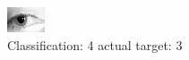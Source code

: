 \begin{figure}[h!]
\begin{center}
\includegraphics[width=0.60\columnwidth]{figures/ID1274_class_4_target_3.png}
\end{center}
\caption{ Classification: 4 actual target: 3}
\label{fig:ID1274_class_4_target_3}
\end{figure}
